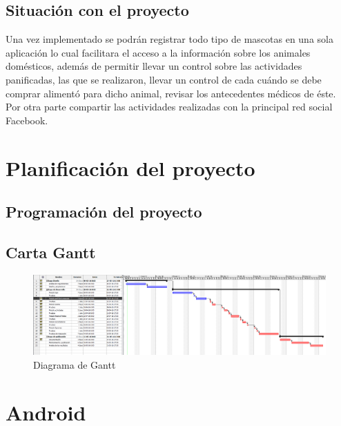 \documentclass[letterpaper,12pt,openany,oneside]{book}
\begin{document}
\section{Situaci\'on con el proyecto}


Una vez implementado se podrán registrar todo tipo de mascotas en una sola aplicación lo cual facilitara el acceso a la información sobre los animales domésticos, además de permitir llevar un control sobre las actividades panificadas, las que se realizaron,  llevar un control de cada cuándo se debe comprar alimentó para dicho animal, revisar los antecedentes médicos  de éste. Por otra parte compartir las actividades realizadas con la principal red social Facebook.

\chapter{Planificación  del proyecto}


\section{Programación del proyecto}

\newpage

\section{Carta Gantt}
\begin{figure}[!h]
  \centering
    \includegraphics[width=1.3\textwidth\ ,angle=270]{cartagantt.png}
  \caption{Diagrama de Gantt}
  \label{fig:Diagrama de Gantt}
\end{figure}

\chapter{Android}
\end{document}
